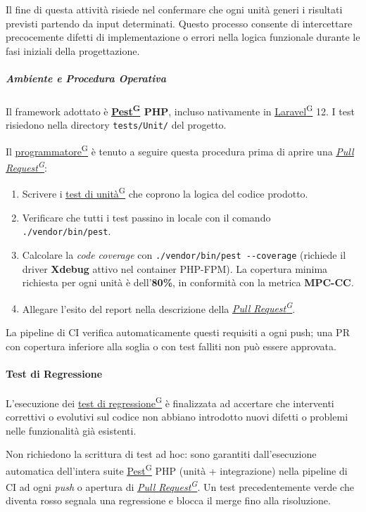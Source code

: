 \documentclass[a4paper,12pt]{article}
\providecommand{\glslink}[2]{\href{https://alittlebyte-19.github.io/Documentazione/glossario.html\#gls-#1}{\underline{#2}\textsuperscript{\scriptsize G}}}
\begin{document}
Il fine di questa attività risiede nel confermare che ogni unità generi i risultati previsti partendo da input determinati. Questo processo consente di intercettare precocemente difetti di implementazione o errori nella logica funzionale durante le fasi iniziali della progettazione.

\subparagraph{Ambiente e Procedura Operativa}
Il framework adottato è \textbf{\glslink{pest}{Pest} PHP}, incluso nativamente in \glslink{laravel}{Laravel} 12. I test risiedono nella directory \texttt{tests/Unit/} del progetto.

Il \glslink{programmatore}{programmatore} è tenuto a seguire questa procedura prima di aprire una \textit{\glslink{pull-request}{Pull Request}}:
\begin{enumerate}
    \item Scrivere i \glslink{test-di-unita}{test di unità} che coprono la logica del codice prodotto.
    \item Verificare che tutti i test passino in locale con il comando \texttt{./vendor/bin/pest}.
    \item Calcolare la \textit{code coverage} con \texttt{./vendor/bin/pest -{}-coverage} (richiede il driver \textbf{Xdebug} attivo nel container PHP-FPM). La copertura minima richiesta per ogni unità è dell'\textbf{80\%}, in conformità con la metrica \textbf{MPC-CC}.
    \item Allegare l'esito del report nella descrizione della \textit{\glslink{pull-request}{Pull Request}}.
\end{enumerate}
La pipeline di CI verifica automaticamente questi requisiti a ogni push; una PR con copertura inferiore alla soglia o con test falliti non può essere approvata.

\paragraph{Test di Regressione}
L'esecuzione dei \glslink{test-di-regressione}{test di regressione} è finalizzata ad accertare che interventi correttivi o evolutivi sul codice non abbiano introdotto nuovi difetti o problemi nelle funzionalità già esistenti.

Non richiedono la scrittura di test ad hoc: sono garantiti dall'esecuzione automatica dell'intera suite \glslink{pest}{Pest} PHP (unità + integrazione) nella pipeline di CI ad ogni \textit{push} o apertura di \textit{\glslink{pull-request}{Pull Request}}. Un test precedentemente verde che diventa rosso segnala una regressione e blocca il merge fino alla risoluzione.
\end{document}
